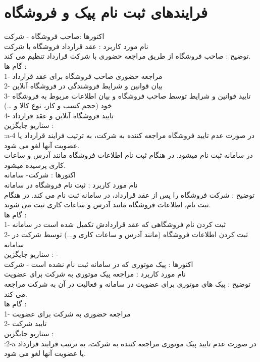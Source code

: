\documentclass[14pt]{article}
\begin{document}
 
\section{ فرایندهای ثبت نام پیک و فروشگاه}

اکتورها :صاحب فروشگاه - شرکت\\
نام مورد کاربرد : عقد قرارداد فروشگاه با شرکت \\
توضیح : صاحب فروشگاه از طریق مراجعه حضوری با شرکت قرارداد تنظیم می کند.\\
گام ها :\\
1- مراجعه حضوری صاحب فروشگاه برای عقد قرارداد\\
2- بیان قوانین و شرایط فروشندگی در فروشگاه آنلاین\\
3- تایید قوانین و شرایط توسط صاحب فروشگاه و بیان اطلاعات مربوط به فروشگاه خود (حجم کسب و کار، نوع کالا و …) \\
4- تایید فروشگاه آنلاین و عقد قرارداد\\
سناریو جایگزین :\\
:a-4 در صورت عدم تایید فروشگاه مراجعه کننده به شرکت، به ترتیب فرایند قرارداد یا عضویت آنها لغو می شود.\\
 
 
در سامانه ثبت نام میشود. در هنگام ثبت نام اطلاعات فروشگاه مانند آدرس و ساعات کاری پرسیده میشود. \\
 
اکتورها : شرکت- سامانه\\
نام مورد کاربرد : ثبت نام فروشگاه در سامانه \\
توضیح : شرکت فروشگاه را پس از عقد قرارداد، در سامانه ثبت نام می کند. در هنگام ثبت نام، اطلاعات فروشگاه مانند آدرس و ساعات کاری ثبت می شوند.\\
گام ها : \\
1- ثبت کردن نام فروشگاهی که عقد قراردادش تکمیل شده است در سامانه\\
2-  ثبت کردن اطلاعات فروشگاه (مانند آدرس و ساعات کاری و...) توسط شرکت در سامانه\\
سناریو جایگزین : -\\


اکتورها : پیک موتوری که در سامانه ثبت نام نشده است - شرکت \\
نام مورد کاربرد : مراجعه پیک موتوری به شرکت برای عضویت \\
توضیح : پیک های موتوری برای عضویت در سامانه و فعالیت در آن به شرکت مراجعه می کند. \\
گام ها : \\
1- مراجعه حضوری به شرکت برای عضویت \\
2- تایید شرکت  \\
سناریو جایگزین :  \\
:2-a در صورت عدم تایید پیک موتوری مراجعه کننده به شرکت، به ترتیب فرایند قرارداد یا عضویت آنها لغو می شود. \\
 
\end{document}

